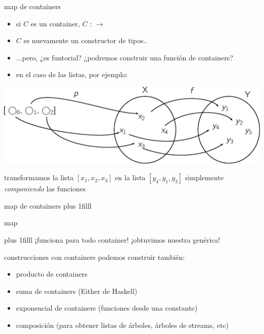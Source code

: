 \documentclass[9pt]{beamer}
\newcommand{\saltar}{\vspace{1ex}}
\newcommand{\llenar}{\vskip0pt plus 1filll}
\begin{document}
\begin{frame}{map de containers}
  \begin{itemize}
  \item si $C$ es un container, \AgdaFunction{$\llbracket$} $C$ \AgdaFunction{$\rrbracket$} :  $\to$ 
  \item \AgdaFunction{$\llbracket$} $C$ \AgdaFunction{$\rrbracket$} es nuevamente un constructor de tipos..
  \item ...pero, ¿es funtorial? ¿podremos construir una función  de containers?
    \pause
  \item en el caso de las listas, por ejemplo:
  \end{itemize} 
  \includegraphics[scale=0.4]{img/map.eps}\\\saltar
  
  transformamos la lista $[x_1,x_2,x_3]$ en la lista $[y_4,y_1,y_3]$ simplemente \emph{componiendo} las funciones
\end{frame}

\begin{frame}{map de containers}
  \llenar
  \begin{exampleblock}{map}
  \end{exampleblock}
  \llenar
  \pause
  ¡funciona para todo container! ¡obtuvimos nuestra  genérica!
\end{frame}

\begin{frame}{construcciones con containers}
  podemos construir también:
  \begin{itemize}
    \item producto de containers
    \item suma de containers (Either de Haskell)
    \item exponencial de containers (funciones desde una constante) 
    \item composición (para obtener listas de árboles, árboles de streams, etc)
  \end{itemize}
\end{frame}
\end{document}
